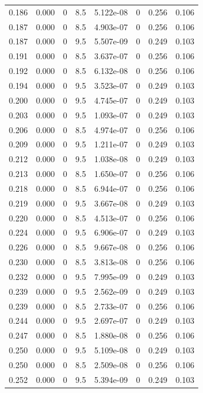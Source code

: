 \documentclass[preview]{standalone}
\begin{document}
{{{\begin{tabular}{L{1.2cm}C{1.2cm} C{0.3cm}C{0.5cm} C{1.4cm}C{1.4cm} C{1.4cm}C{1.4cm}}
  0.186  &  0.000  & 0     & 8.5 &  5.122e-08  & 0  & 0.256 &  0.106   \\ 
  0.187  &  0.000  & 0     & 8.5 &  4.903e-07  & 0  & 0.256 &  0.106   \\ 
  0.187  &  0.000  & 0     & 9.5 &  5.507e-09  & 0  & 0.249 &  0.103   \\ 
  0.191  &  0.000  & 0     & 8.5 &  3.637e-07  & 0  & 0.256 &  0.106   \\ 
  0.192  &  0.000  & 0     & 8.5 &  6.132e-08  & 0  & 0.256 &  0.106   \\ 
  0.194  &  0.000  & 0     & 9.5 &  3.523e-07  & 0  & 0.249 &  0.103   \\ 
  0.200  &  0.000  & 0     & 9.5 &  4.745e-07  & 0  & 0.249 &  0.103   \\ 
  0.203  &  0.000  & 0     & 9.5 &  1.093e-07  & 0  & 0.249 &  0.103   \\ 
  0.206  &  0.000  & 0     & 8.5 &  4.974e-07  & 0  & 0.256 &  0.106   \\ 
  0.209  &  0.000  & 0     & 9.5 &  1.211e-07  & 0  & 0.249 &  0.103   \\ 
  0.212  &  0.000  & 0     & 9.5 &  1.038e-08  & 0  & 0.249 &  0.103   \\ 
  0.213  &  0.000  & 0     & 8.5 &  1.650e-07  & 0  & 0.256 &  0.106   \\ 
  0.218  &  0.000  & 0     & 8.5 &  6.944e-07  & 0  & 0.256 &  0.106   \\ 
  0.219  &  0.000  & 0     & 9.5 &  3.667e-08  & 0  & 0.249 &  0.103   \\ 
  0.220  &  0.000  & 0     & 8.5 &  4.513e-07  & 0  & 0.256 &  0.106   \\ 
  0.224  &  0.000  & 0     & 9.5 &  6.906e-07  & 0  & 0.249 &  0.103   \\ 
  0.226  &  0.000  & 0     & 8.5 &  9.667e-08  & 0  & 0.256 &  0.106   \\ 
  0.230  &  0.000  & 0     & 8.5 &  3.813e-08  & 0  & 0.256 &  0.106   \\ 
  0.232  &  0.000  & 0     & 9.5 &  7.995e-09  & 0  & 0.249 &  0.103   \\ 
  0.239  &  0.000  & 0     & 9.5 &  2.562e-09  & 0  & 0.249 &  0.103   \\ 
  0.239  &  0.000  & 0     & 8.5 &  2.733e-07  & 0  & 0.256 &  0.106   \\ 
  0.244  &  0.000  & 0     & 9.5 &  2.697e-07  & 0  & 0.249 &  0.103   \\ 
  0.247  &  0.000  & 0     & 8.5 &  1.880e-08  & 0  & 0.256 &  0.106   \\ 
  0.250  &  0.000  & 0     & 9.5 &  5.109e-08  & 0  & 0.249 &  0.103   \\ 
  0.250  &  0.000  & 0     & 8.5 &  2.509e-08  & 0  & 0.256 &  0.106   \\ 
  0.252  &  0.000  & 0     & 9.5 &  5.394e-09  & 0  & 0.249 &  0.103   \\ 
\hline 
\end{tabular} 

}}}
\end{document}
